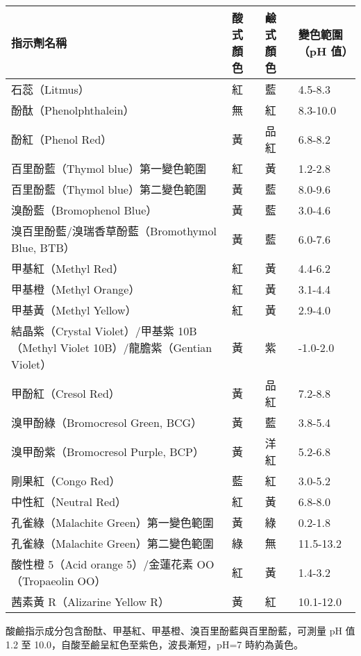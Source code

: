 \documentclass[a4paper,12pt]{article}
\begin{document}
\begin{longtable}[c]{|p{}|p{}|p{}|p{}|}
\hline
\textbf{指示劑名稱} & \textbf{酸式顏色} & \textbf{鹼式顏色} & \textbf{變色範圍（pH 值）} \\\hline
\endhead
石蕊（Litmus） & 紅 & 藍 & 4.5-8.3 \\\hline
酚酞（Phenolphthalein） & 無 & 紅 & 8.3-10.0 \\\hline
酚紅（Phenol Red） & 黃 & 品紅 & 6.8-8.2 \\\hline
百里酚藍（Thymol blue）第一變色範圍 & 紅 & 黃 & 1.2-2.8 \\\hline
百里酚藍（Thymol blue）第二變色範圍 & 黃 & 藍 & 8.0-9.6 \\\hline
溴酚藍（Bromophenol Blue） & 黃 & 藍 & 3.0-4.6 \\\hline
溴百里酚藍/溴瑞香草酚藍（Bromothymol Blue, BTB） & 黃 & 藍 & 6.0-7.6 \\\hline
甲基紅（Methyl Red） & 紅 & 黃 & 4.4-6.2 \\\hline
甲基橙（Methyl Orange） & 紅 & 黃 & 3.1-4.4 \\\hline
甲基黃（Methyl Yellow） & 紅 & 黃 & 2.9-4.0 \\\hline
結晶紫（Crystal Violet）/甲基紫 10B（Methyl Violet 10B）/龍膽紫（Gentian Violet） & 黃 & 紫 & -1.0-2.0 \\\hline
甲酚紅（Cresol Red） & 黃 & 品紅 & 7.2-8.8 \\\hline
溴甲酚綠（Bromocresol Green, BCG） & 黃 & 藍 & 3.8-5.4 \\\hline
溴甲酚紫（Bromocresol Purple, BCP） & 黃 & 洋紅 & 5.2-6.8 \\\hline
剛果紅（Congo Red） & 藍 & 紅 & 3.0-5.2 \\\hline
中性紅（Neutral Red） & 紅 & 黃 & 6.8-8.0 \\\hline
孔雀綠（Malachite Green）第一變色範圍 & 黃 & 綠 & 0.2-1.8 \\\hline
孔雀綠（Malachite Green）第二變色範圍 & 綠 & 無 & 11.5-13.2 \\\hline
酸性橙 5（Acid orange 5）/金蓮花素 OO（Tropaeolin OO） & 紅 & 黃 & 1.4-3.2 \\\hline
茜素黃 R（Alizarine Yellow R） & 黃 & 紅 & 10.1-12.0 \\\hline
\end{longtable}\FloatBarrier
{}
酸鹼指示成分包含酚酞、甲基紅、甲基橙、溴百里酚藍與百里酚藍，可測量 pH 值 1.2 至 10.0，自酸至鹼呈紅色至紫色，波長漸短，pH=7 時約為黃色。
\end{document}

